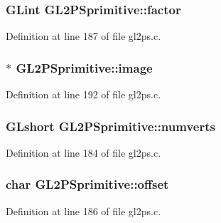 \subsubsection[{factor}]{\setlength{\rightskip}{0pt plus 5cm}G\+Lint G\+L2\+P\+Sprimitive\+::factor}\label{struct_g_l2_p_sprimitive_a668f776cc038ba6697fb3a59ac9808d8}


Definition at line 187 of file gl2ps.\+c.

\hypertarget{struct_g_l2_p_sprimitive_aeb241b576955f15767567f8f12d82088}{}
\subsubsection[{image}]{$\ast$ G\+L2\+P\+Sprimitive\+::image}\label{struct_g_l2_p_sprimitive_aeb241b576955f15767567f8f12d82088}


Definition at line 192 of file gl2ps.\+c.

\hypertarget{struct_g_l2_p_sprimitive_a0c08e03e33ce4a72b2a0ffa1af80621c}{}
\subsubsection[{numverts}]{\setlength{\rightskip}{0pt plus 5cm}G\+Lshort G\+L2\+P\+Sprimitive\+::numverts}\label{struct_g_l2_p_sprimitive_a0c08e03e33ce4a72b2a0ffa1af80621c}


Definition at line 184 of file gl2ps.\+c.

\hypertarget{struct_g_l2_p_sprimitive_a17d640d1108f03b6e57c9a4705266944}{}
\subsubsection[{offset}]{\setlength{\rightskip}{0pt plus 5cm}char G\+L2\+P\+Sprimitive\+::offset}\label{struct_g_l2_p_sprimitive_a17d640d1108f03b6e57c9a4705266944}


Definition at line 186 of file gl2ps.\+c.

\hypertarget{struct_g_l2_p_sprimitive_a60f7dcbf793edb8c10f617e77a817c33}{}
